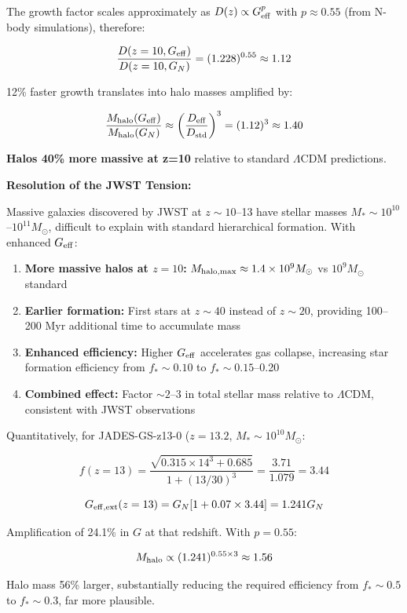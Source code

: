 \documentclass[11pt,a4paper]{article}
\providecommand{\tightlist}{\setlength{\itemsep}{0pt}\setlength{\parskip}{0pt}}
\begin{document}
The growth factor scales approximately as \(D(z) \propto G_{\rm eff}^p\)
with \(p \approx 0.55\) (from N-body simulations), therefore:

\[\frac{D(z=10, G_{\rm eff})}{D(z=10, G_N)} = (1.228)^{0.55} \approx 1.12\]

12\% faster growth translates into halo masses amplified by:

\[\frac{M_{\rm halo}(G_{\rm eff})}{M_{\rm halo}(G_N)} \approx \left(\frac{D_{\rm eff}}{D_{\rm std}}\right)^3 = (1.12)^3 \approx 1.40\]

\textbf{Halos 40\% more massive at z=10} relative to standard
\(\Lambda\)CDM predictions.

\textbf{Resolution of the JWST Tension:}

Massive galaxies discovered by JWST at \(z \sim 10\)--13 have stellar
masses \(M_* \sim 10^{10}\)--\(10^{11} M_\odot\), difficult to explain
with standard hierarchical formation. With enhanced \(G_{\rm eff}\):

\begin{enumerate}
\def\labelenumi{\arabic{enumi}.}
\tightlist
\item
  \textbf{More massive halos at \(z=10\):}
  \(M_{\rm halo,max} \approx 1.4 \times 10^9 M_\odot\) vs
  \(10^9 M_\odot\) standard
\item
  \textbf{Earlier formation:} First stars at \(z \sim 40\) instead of
  \(z \sim 20\), providing 100--200 Myr additional time to accumulate
  mass
\item
  \textbf{Enhanced efficiency:} Higher \(G_{\rm eff}\) accelerates gas
  collapse, increasing star formation efficiency from \(f_* \sim 0.10\)
  to \(f_* \sim 0.15\)--0.20
\item
  \textbf{Combined effect:} Factor \(\sim 2\)--3 in total stellar mass
  relative to \(\Lambda\)CDM, consistent with JWST observations
\end{enumerate}

Quantitatively, for JADES-GS-z13-0 (\(z=13.2\),
\(M_* \sim 10^{10} M_\odot\):

\[f(z=13) = \frac{\sqrt{0.315 \times 14^3 + 0.685}}{1+(13/30)^3} = \frac{3.71}{1.079} = 3.44\]

\[G_{\rm eff,ext}(z=13) = G_N[1 + 0.07 \times 3.44] = 1.241 G_N\]

Amplification of 24.1\% in \(G\) at that redshift. With \(p = 0.55\):

\[M_{\rm halo} \propto (1.241)^{0.55 \times 3} \approx 1.56\]

Halo mass 56\% larger, substantially reducing the required efficiency
from \(f_* \sim 0.5\) to \(f_* \sim 0.3\), far more plausible.
\end{document}
